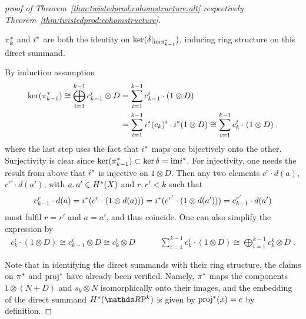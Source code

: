 \begin{proof}[proof of
  Theorem~\ref{thm:twistedprod:cohomstructure:alt}
  respectively Theorem~\ref{thm:twistedprod:cohomstructure}]
\begin{description}
    ${\pi}^*_{k}$ and ${i}^*$ are both the identity on
    $\ker(\tilde\delta|_{\mathrm{im}{\pi}^*_{k-1}})$, inducing ring structure
    on this direct summand.
  \item[$\ker(\pb\pi_{k-1})\cong \bigoplus_{i=1}^{k-1} c_k^i\otimes D$:]
    By induction assumption
    \begin{align*}
      \ker({\pi}^*_{k-1})
      \cong \bigoplus_{i=1}^{k-1} c_{k-1}^i\otimes D
      &= \sum_{i=1}^{k-1} c_{k-1}^i\cdot (1\otimes D) \\
      &=
        \sum_{i=1}^{k-1} {i}^*(c_k)^i\cdot {i}^*(1\otimes D) 
      \cong
        \sum_{i=1}^{k-1} c_k^i\cdot (1\otimes D)\;.
    \end{align*}
    where the last step uses the fact that ${i}^*$ maps one
    bijectively onto the other. Surjectivity is clear since
    $\ker({\pi}^*_{k-1})\subset\ker\delta=\mathrm{im}{i}^*$.
    For injectivity, one needs the result from above that ${i}^*$ is
    injective on $1\otimes D$. Then any two elements
    $c^r\cdot d(a)$, $c^{r'}\cdot d(a')$, with
    $a,a'\in H^*(X)$ and $r,r'<k$ such that
    \begin{gather*}
      c_{k-1}^r\cdot d(a)
      = {i}^*(c^r\cdot (1\otimes d(a)))
      = {i}^*(c^{r'}\cdot (1\otimes d(a')))
      = c_{k-1}^{r'}\cdot d(a')
    \end{gather*}
    must fulfil $r=r'$ and $a=a'$, and thus coincide.
    One can also simplify the expression by
    \begin{gather*}
      c_k^i\cdot (1\otimes D)
      \cong c_{k-1}^i\otimes D
      \cong c_k^i\otimes D
      \qquad\quad
      \sum_{i=1}^{k-1}c_k^i\cdot (1\otimes D)
      \cong \bigoplus_{i=1}^{k-1} c_k^k\otimes D
      \;.
    \end{gather*}
  \end{description}
  Note that in identifying the direct summands with their ring structure,
  the claims on ${\pi}^*$ and ${\mathrm{proj}}^*$ have already been verified.
  Namely, ${\pi}^*$ maps the components $1\otimes(N+D)$ and
  $s_k\otimes N$ isomorphically onto their images, and the embedding
  of the direct summand $\H^*(\RP k)$ is given by ${\mathrm{proj}}^*(x)=c$
  by definition.


\end{proof}
